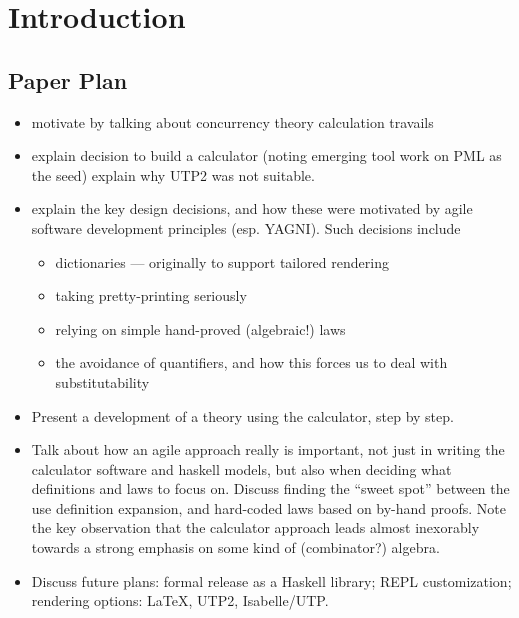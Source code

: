 \section{Introduction}\label{sec:Intro}


\subsection*{Paper Plan}

\begin{itemize}
  \item motivate by talking about
  concurrency theory calculation travails
  \item explain decision to build a calculator
   (noting emerging tool work on PML as the seed)
   explain why UTP2 was not suitable.
  \item
     explain the key design decisions,
     and how these were motivated by agile software development
     principles (esp. YAGNI).
     Such decisions include
     \begin{itemize}
       \item dictionaries --- originally to support tailored rendering
       \item taking pretty-printing seriously
       \item relying on simple hand-proved (algebraic!) laws
       \item the avoidance of quantifiers,
        and how this forces us to deal with substitutability
     \end{itemize}
  \item
     Present a development of a theory using the calculator,
     step by step.
  \item
    Talk about how an agile approach really is important,
    not just in writing the calculator software and haskell models,
    but also when deciding what definitions and laws to focus on.
    Discuss finding the ``sweet spot'' between the use definition
    expansion, and hard-coded laws based on by-hand proofs.
    Note the key observation that the calculator approach
    leads almost inexorably towards a strong emphasis
    on some kind of (combinator?) algebra.
  \item
    Discuss future plans: formal release as a Haskell library;
    REPL customization; rendering options: \LaTeX, UTP2, Isabelle/UTP.
\end{itemize}

